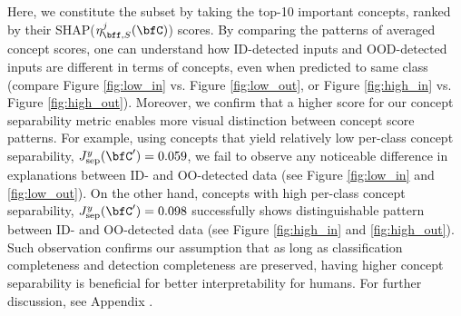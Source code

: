 Here, we constitute the subset by taking the top-10 important concepts, ranked by their SHAP($\eta^{j}_{\bff, S}(\bfC)$) scores.
By comparing the patterns of averaged concept scores, one can understand how ID-detected inputs and OOD-detected inputs are different in terms of concepts, even when predicted to same class (compare Figure \ref{fig:low_in} vs. Figure \ref{fig:low_out}, or Figure \ref{fig:high_in} vs. Figure \ref{fig:high_out}).
Moreover, we confirm that a higher score for our concept separability metric enables more visual distinction  between concept score patterns.
For example, using concepts that yield relatively low per-class concept separability, $J^y_{\textrm{sep}}(\bfC')=0.059$, we fail to observe any noticeable difference in explanations between ID- and OO-detected data (see Figure \ref{fig:low_in} and \ref{fig:low_out}). 
On the other hand, concepts with high per-class concept separability, $J^y_{\textrm{sep}}(\bfC')=0.098$ successfully shows distinguishable pattern between ID- and OO-detected data (see Figure \ref{fig:high_in} and \ref{fig:high_out}). 
Such observation confirms our assumption that as long as classification completeness and detection completeness are preserved, having higher concept separability is beneficial for better interpretability for humans.
For further discussion, see Appendix .
